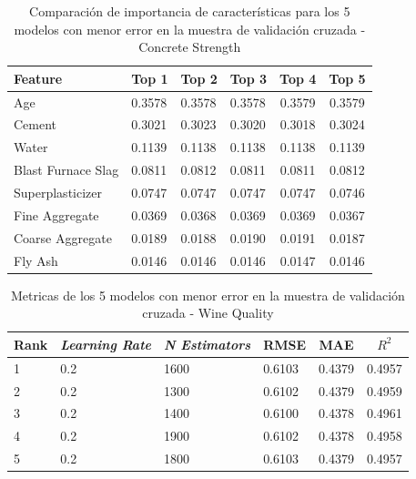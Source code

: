 \begin{table}[ht!]
\centering
\caption{Comparación de importancia de características para los 5 modelos con menor error en la muestra de validación cruzada - Concrete Strength}
\label{tbl:imp_concrete_strength}
\begin{tabular}{llllcc}
\hline
Feature & Top 1 & Top 2 & Top 3 & Top 4 & Top 5 \\
\hline
Age & 0.3578 & 0.3578 & 0.3578 & 0.3579 & 0.3579 \\
Cement & 0.3021 & 0.3023 & 0.3020 & 0.3018 & 0.3024 \\
Water & 0.1139 & 0.1138 & 0.1138 & 0.1138 & 0.1139 \\
Blast Furnace Slag & 0.0811 & 0.0812 & 0.0811 & 0.0811 & 0.0812 \\
Superplasticizer & 0.0747 & 0.0747 & 0.0747 & 0.0747 & 0.0746 \\
Fine Aggregate & 0.0369 & 0.0368 & 0.0369 & 0.0369 & 0.0367 \\
Coarse Aggregate & 0.0189 & 0.0188 & 0.0190 & 0.0191 & 0.0187 \\
Fly Ash & 0.0146 & 0.0146 & 0.0146 & 0.0147 & 0.0146 \\
\hline
\end{tabular}
\end{table}

\begin{table}[ht!]
\centering
\caption{Metricas de los 5 modelos con menor error en la muestra de validación cruzada - Wine Quality}
\label{tbl:metrics_wine_quality}
\begin{tabular}{llllcc}
\hline
Rank & \textit{Learning Rate} & \textit{N Estimators} & RMSE & MAE & $R^2$ \\
\hline
1 & 0.2& 1600 & 0.6103 & 0.4379 & 0.4957 \\
2 & 0.2& 1300 & 0.6102 & 0.4379 & 0.4959 \\
3 & 0.2& 1400 & 0.6100 & 0.4378 & 0.4961 \\
4 & 0.2& 1900 & 0.6102 & 0.4378 & 0.4958 \\
5 & 0.2& 1800 & 0.6103 & 0.4379 & 0.4957 \\
\hline
\end{tabular}
\end{table}

